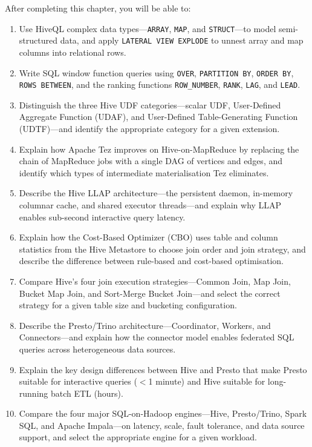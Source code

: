 \begin{chapterlearning}
After completing this chapter, you will be able to:
\begin{enumerate}
  \item Use HiveQL complex data types---\texttt{ARRAY}, \texttt{MAP},
        and \texttt{STRUCT}---to model semi-structured data, and apply
        \texttt{LATERAL VIEW EXPLODE} to unnest array and map columns
        into relational rows.
  \item Write SQL window function queries using \texttt{OVER},
        \texttt{PARTITION BY}, \texttt{ORDER BY}, \texttt{ROWS BETWEEN},
        and the ranking functions \texttt{ROW\_NUMBER}, \texttt{RANK},
        \texttt{LAG}, and \texttt{LEAD}.
  \item Distinguish the three Hive UDF categories---scalar UDF, User-Defined
        Aggregate Function (UDAF), and User-Defined Table-Generating Function
        (UDTF)---and identify the appropriate category for a given extension.
  \item Explain how Apache Tez improves on Hive-on-MapReduce by replacing
        the chain of MapReduce jobs with a single DAG of vertices and
        edges, and identify which types of intermediate materialisation
        Tez eliminates.
  \item Describe the Hive LLAP architecture---the persistent daemon,
        in-memory columnar cache, and shared executor threads---and explain
        why LLAP enables sub-second interactive query latency.
  \item Explain how the Cost-Based Optimizer (CBO) uses table and column
        statistics from the Hive Metastore to choose join order and join
        strategy, and describe the difference between rule-based and
        cost-based optimisation.
  \item Compare Hive's four join execution strategies---Common Join,
        Map Join, Bucket Map Join, and Sort-Merge Bucket Join---and select
        the correct strategy for a given table size and bucketing configuration.
  \item Describe the Presto/Trino architecture---Coordinator, Workers,
        and Connectors---and explain how the connector model enables
        federated SQL queries across heterogeneous data sources.
  \item Explain the key design differences between Hive and Presto that
        make Presto suitable for interactive queries ($<$1 minute) and
        Hive suitable for long-running batch ETL (hours).
  \item Compare the four major SQL-on-Hadoop engines---Hive, Presto/Trino,
        Spark SQL, and Apache Impala---on latency, scale, fault tolerance,
        and data source support, and select the appropriate engine for
        a given workload.
\end{enumerate}
\end{chapterlearning}

